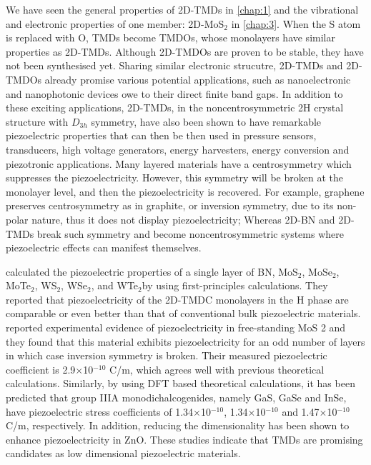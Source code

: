 We have seen the general properties of 2D-TMDs in \autoref{chap:1} and the vibrational and electronic properties of one member: 2D-MoS$_2$ in \autoref{chap:3}. When the S atom is replaced with O, TMDs become TMDOs, whose monolayers have similar properties as 2D-TMDs. Although 2D-TMDOs are proven to be stable, they have not been synthesised yet. Sharing similar electronic strucutre, 2D-TMDs and 2D-TMDOs already promise various potential applications, such as nanoelectronic and nanophotonic devices owe to their direct finite band gaps\cite{Jariwala2014,Wang2012}. In addition to these exciting applications, 2D-TMDs, in the noncentrosymmetric 2H crystal structure with $D_{3h}$ symmetry, have also been shown to have remarkable piezoelectric properties that can then be then used in pressure sensors, transducers, high voltage generators, energy harvesters, energy conversion and piezotronic applications. Many layered materials have a centrosymmetry which suppresses the piezoelectricity. However, this symmetry will be broken at the monolayer level, and then the piezoelectricity is recovered. For example, graphene preserves centrosymmetry as in graphite, or inversion symmetry, due to its non-polar nature, thus it does not display piezoelectricity; Whereas 2D-BN and 2D-TMDs break such symmetry and become noncentrosymmetric systems where piezoelectric effects can manifest themselves. 

\citet{Duerloo2012} calculated the piezoelectric properties of a single layer of BN, MoS$_2$, MoSe$_2$, MoTe$_2$, WS$_2$, WSe$_2$, and WTe$_2$by using first-principles calculations. They reported that piezoelectricity of the 2D-TMDC monolayers in the H phase are comparable or even better than that of conventional bulk piezoelectric materials. \citet{Zhu2015} reported 
experimental evidence of piezoelectricity in free-standing MoS 2 and they found that this material exhibits piezoelectricity for an odd number of layers in which case inversion symmetry is broken. Their measured piezoelectric coefficient is 2.9$\times$10$^{-10}$ C/m, which agrees well with previous theoretical calculations\cite{Duerloo2012}.  Similarly, by using DFT based theoretical calculations, it has been predicted that group IIIA monodichalcogenides, namely GaS, GaSe and InSe, have piezoelectric stress coefficients of 1.34$\times$10$^{-10}$, 1.34$\times$10$^{-10}$ and 1.47$\times$10$^{-10}$ C/m, respectively\cite{Li2015a}.  In addition, reducing the dimensionality has been shown to enhance piezoelectricity in ZnO\cite{Xiang2006}. These studies indicate that TMDs are promising candidates as low dimensional piezoelectric materials. 


